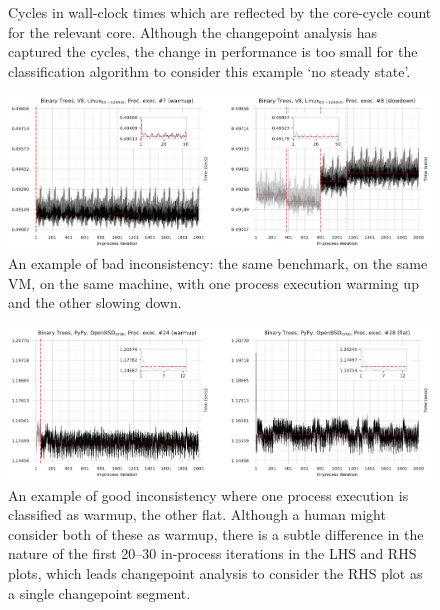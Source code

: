 \documentclass[acmsmall]{acmart}\settopmatter{printfolios=true}
\begin{document}
\begin{figure}[t]
\begin{minipage}[t]{0.485\textwidth}
\caption{Cycles in wall-clock times which are reflected by the core-cycle count
for the relevant core. Although the changepoint analysis has captured the
cycles, the change in performance is too small for the classification algorithm
to consider this example `no steady state'.}
\label{fig:examples:cycles}
\end{minipage}
\end{figure}

\begin{figure}[t!]
\centering
\includegraphics[width=\textwidth]{examples/new_inconsistent.pdf}
\caption{An example of bad inconsistency: the same benchmark, on
the same VM, on the same machine, with one process execution warming
up and the other slowing down.}
\label{fig:examples:inconsistent}
\vspace{-.4cm}
\end{figure}

\begin{figure}[t]
\centering%
\includegraphics[width=\textwidth]{examples/warmup_flat.pdf}
\caption{An example of good inconsistency where one process execution
is classified as warmup, the other flat. Although a human might consider
both of these as warmup, there is a subtle difference in the nature of the first 20--30
in-process iterations in the LHS and RHS plots, which leads changepoint
analysis to consider the RHS plot as a single changepoint segment.}
\label{fig:examples:warmup_flat}
\vspace{-.4cm}
\end{figure}
\end{document}

